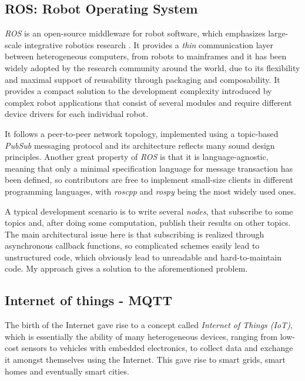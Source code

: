 \documentclass[sigplan,review,anonymous]{acmart}\settopmatter{printfolios=true}
\begin{document}

\subsection{ROS: Robot Operating System}

\textit{ROS} is an open-source middleware for robot software, which emphasizes large-scale integrative robotics research \cite{ROS}. It provides a \textit{thin} communication layer between heterogeneous computers, from robots to mainframes and it has been widely adopted by the research community around the world, due to its flexibility and maximal support of reusability through packaging and composability. It provides a compact solution to the development complexity introduced by complex robot applications that consist of several modules and require different device drivers for each individual robot. 

It follows a peer-to-peer network topology, implemented using a topic-based \textit{PubSub} messaging protocol and its architecture reflects many sound design principles. Another great property of \textit{ROS} is that it is language-agnostic, meaning that only a minimal specification language for message transaction has been defined, so contributors are free to implement small-size clients in different programming languages, with \textit{roscpp} and \textit{rospy} being the most widely used ones.

A typical development scenario is to write several \textit{nodes}, that subscribe to some topics and, after doing some computation, publish their results on other topics. The main architectural issue here is that subscribing is realized through asynchronous callback functions, so complicated schemes easily lead to unstructured code, which obviously lead to unreadable and hard-to-maintain code. My approach gives a solution to the aforementioned problem.
 
\subsection{Internet of things - MQTT}

The birth of the Internet gave rise to a concept called \textit{Internet of Things (IoT)}, which is essentially the ability of many heterogeneous devices, ranging from low-cost sensors to vehicles with embedded electronics, to collect data and exchange it amongst themselves using the Internet. This gave rise to smart grids, smart homes and eventually smart cities. 
\end{document}
